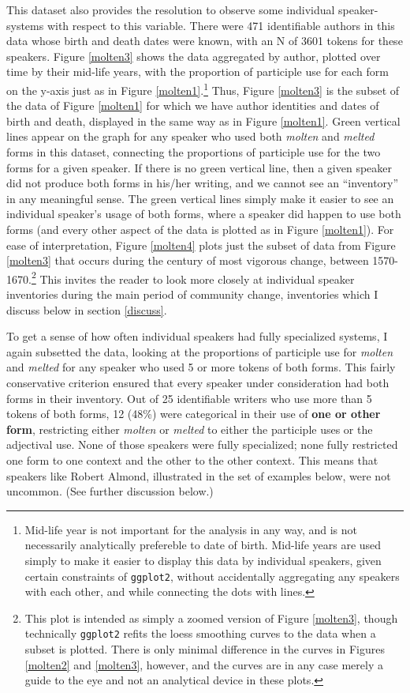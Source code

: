 \documentclass{artikel3}
\begin{document}
This dataset also provides the resolution to observe some individual speaker-systems with respect to this variable. There were 471 identifiable authors in this data whose birth and death dates were known, with an N of 3601 tokens for these speakers. Figure \ref{molten3} shows the data aggregated by author, plotted over time by their mid-life years, with the proportion of participle use for each form on the y-axis just as in Figure \ref{molten1}.\footnote{Mid-life year is not important for the analysis in any way, and is not necessarily analytically prefereble to date of birth. Mid-life years are used simply to make it easier to display this data by individual speakers, given certain constraints of \texttt{ggplot2}, without accidentally aggregating any speakers with each other, and while connecting the dots with lines.} Thus, Figure \ref{molten3} is the subset of the data of Figure \ref{molten1} for which we have author identities and dates of birth and death, displayed in the same way as in Figure \ref{molten1}. Green vertical lines appear on the graph for any speaker who used both \textsl{molten} and \textsl{melted} forms in this dataset, connecting the proportions of participle use for the two forms for a given  speaker. If there is no green vertical line, then a given speaker did not produce both forms in his/her writing, and we cannot see an ``inventory'' in any meaningful sense. The green vertical lines simply make it easier to see an individual speaker's usage of both forms, where a speaker did happen to use both forms (and every other aspect of the data is plotted as in Figure \ref{molten1}). For ease of interpretation, Figure \ref{molten4} plots just the subset of data from Figure \ref{molten3} that occurs during the century of most vigorous change, between 1570-1670.\footnote{This plot is intended as simply a zoomed version of Figure \ref{molten3}, though technically \texttt{ggplot2} refits the loess smoothing curves to the data when a subset is plotted. There is only minimal difference in the curves in Figures \ref{molten2} and \ref{molten3}, however, and the curves are in any case merely a guide to the eye and not an analytical device in these plots.} This invites the reader to look more closely at individual speaker inventories during the main period of community change, inventories which I discuss below in section \ref{discuss}.

To get a sense of how often individual speakers had fully specialized systems, I again subsetted the data, looking at the proportions of participle use for \textsl{molten} and \textsl{melted} for any speaker who used 5 or more tokens of both forms. This fairly conservative criterion ensured that every speaker under consideration had both forms in their inventory. Out of 25 identifiable writers who use more than 5 tokens of both forms, 12 (48\%) were categorical in their use of \textbf{one or other form}, restricting either \textsl{molten} or \textsl{melted} to either the participle uses or the adjectival use. None of those speakers were fully specialized; none fully restricted one form to one context and the other to the other context. This means that speakers like Robert Almond, illustrated in the set of examples below, were not uncommon. (See further discussion below.)
\end{document}
